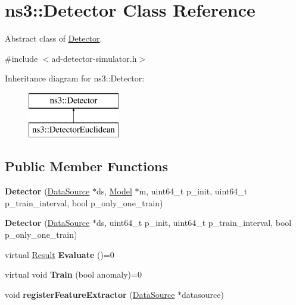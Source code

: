 \hypertarget{classns3_1_1Detector}{}\section{ns3\+:\+:Detector Class Reference}
\label{classns3_1_1Detector}


Abstract class of \hyperlink{classns3_1_1Detector}{Detector}.  




{\ttfamily \#include $<$ad-\/detector-\/simulator.\+h$>$}

Inheritance diagram for ns3\+:\+:Detector\+:\begin{figure}[H]
\begin{center}
\leavevmode
\includegraphics[height=2.000000cm]{classns3_1_1Detector}
\end{center}
\end{figure}
\subsection*{Public Member Functions}
\begin{DoxyCompactItemize}
\item 
\hypertarget{classns3_1_1Detector_a2b08bd8f2cc929e4625e37c88bed2d05}{}{\bfseries Detector} (\hyperlink{classns3_1_1DataSource}{Data\+Source} $\ast$ds, \hyperlink{classns3_1_1Model}{Model} $\ast$m, uint64\+\_\+t p\+\_\+init, uint64\+\_\+t p\+\_\+train\+\_\+interval, bool p\+\_\+only\+\_\+one\+\_\+train)\label{classns3_1_1Detector_a2b08bd8f2cc929e4625e37c88bed2d05}

\item 
\hypertarget{classns3_1_1Detector_a9af53e0a50c07bdf4c31b8d98b8f19b0}{}{\bfseries Detector} (\hyperlink{classns3_1_1DataSource}{Data\+Source} $\ast$ds, uint64\+\_\+t p\+\_\+init, uint64\+\_\+t p\+\_\+train\+\_\+interval, bool p\+\_\+only\+\_\+one\+\_\+train)\label{classns3_1_1Detector_a9af53e0a50c07bdf4c31b8d98b8f19b0}

\item 
\hypertarget{classns3_1_1Detector_a96830267a04e65ada11b29c565063bcf}{}virtual \hyperlink{structns3_1_1Result}{Result} {\bfseries Evaluate} ()=0\label{classns3_1_1Detector_a96830267a04e65ada11b29c565063bcf}

\item 
\hypertarget{classns3_1_1Detector_a589c5199ff0dc437dfa2dc59610aa5c7}{}virtual void {\bfseries Train} (bool anomaly)=0\label{classns3_1_1Detector_a589c5199ff0dc437dfa2dc59610aa5c7}

\item 
\hypertarget{classns3_1_1Detector_ab6ab284e496c994d05729f81e66ac587}{}void {\bfseries register\+Feature\+Extractor} (\hyperlink{classns3_1_1DataSource}{Data\+Source} $\ast$datasource)\label{classns3_1_1Detector_ab6ab284e496c994d05729f81e66ac587}

\end{DoxyCompactItemize}

